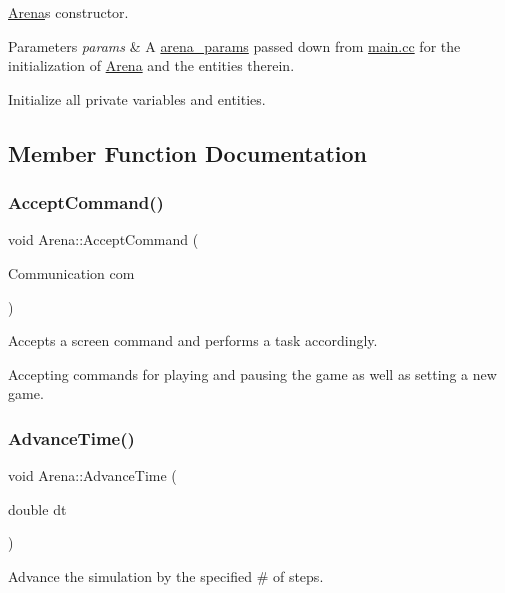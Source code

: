 \mbox{\hyperlink{class_arena}{Arena}}\textquotesingle{}s constructor. 


\begin{DoxyParams}{Parameters}
{\em params} & A \mbox{\hyperlink{structarena__params}{arena\+\_\+params}} passed down from \mbox{\hyperlink{main_8cc}{main.\+cc}} for the initialization of \mbox{\hyperlink{class_arena}{Arena}} and the entities therein.\\
\hline
\end{DoxyParams}
Initialize all private variables and entities. 

\subsection{Member Function Documentation}
\mbox{\label{class_arena_a16fac8e4b2399fcf0db01a9722069c33}} 
\subsubsection{\texorpdfstring{Accept\+Command()}{AcceptCommand()}}
{\footnotesize\ttfamily void Arena\+::\+Accept\+Command (\begin{DoxyParamCaption}\item[{Communication}]{com }\end{DoxyParamCaption})}



Accepts a screen command and performs a task accordingly. 

Accepting commands for playing and pausing the game as well as setting a new game. \mbox{\label{class_arena_ad92d8b2e1593b652445e31d173977fc6}} 
\subsubsection{\texorpdfstring{Advance\+Time()}{AdvanceTime()}}
{\footnotesize\ttfamily void Arena\+::\+Advance\+Time (\begin{DoxyParamCaption}\item[{double}]{dt }\end{DoxyParamCaption})}



Advance the simulation by the specified \# of steps. 


